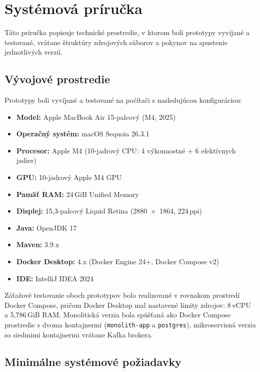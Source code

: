 
\chapter{Systémová príručka}\label{app:system.manual}

Táto príručka popisuje technické prostredie, v ktorom boli prototypy vyvíjané a testované, vrátane štruktúry zdrojových súborov a pokynov na spustenie jednotlivých verzií.

\section{Vývojové prostredie}

Prototypy boli vyvíjané a testované na počítači s nasledujúcou konfiguráciou:

\begin{itemize}
    \item \textbf{Model:} Apple MacBook Air 15-palcový (M4, 2025)
    \item \textbf{Operačný systém:} macOS Sequoia 26.3.1
    \item \textbf{Procesor:} Apple M4 (10-jadrový CPU: 4 výkonnostné + 6 efektívnych jadier)
    \item \textbf{GPU:} 10-jadrový Apple M4 GPU
    \item \textbf{Pamäť RAM:} 24\,GiB Unified Memory
    \item \textbf{Displej:} 15,3-palcový Liquid Retina (2880~$\times$~1864, 224\,ppi)
    \item \textbf{Java:} OpenJDK 17
    \item \textbf{Maven:} 3.9.x
    \item \textbf{Docker Desktop:} 4.x (Docker Engine 24+, Docker Compose v2)
    \item \textbf{IDE:} IntelliJ IDEA 2024
\end{itemize}

Záťažové testovanie oboch prototypov bolo realizované v rovnakom prostredí Docker Compose, pričom Docker Desktop mal nastavené limity zdrojov: 8\,vCPU a 5,786\,GiB RAM. Monolitická verzia bola spúšťaná ako Docker Compose prostredie s dvoma kontajnermi (\texttt{monolith-app} a \texttt{postgres}), mikroservisná verzia so siedmimi kontajnermi vrátane Kafka brokera.

\section{Minimálne systémové požiadavky}

